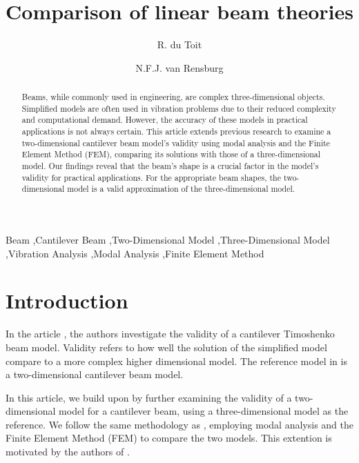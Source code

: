 
\usepackage{geometry}
\geometry{
  left=1.3in,
  right=1.4in,
  top=1.4in,
  bottom=1.4in,
}



\begin{frontmatter}

\title{Comparison of linear beam theories}

\author{R. du Toit}
\author{N.F.J. van Rensburg}
\address{Department of Mathematics, University of Pretoria, Pretoria, South Africa}


\begin{abstract}
Beams, while commonly used in engineering, are complex three-dimensional objects. Simplified models are often used in vibration problems due to their reduced complexity and computational demand. However, the accuracy of these models in practical applications is not always certain. This article extends previous research to examine a two-dimensional cantilever beam model's validity using modal analysis and the Finite Element Method (FEM), comparing its solutions with those of a three-dimensional model. Our findings reveal that the beam's shape is a crucial factor in the model's validity for practical applications. For the appropriate beam shapes, the two-dimensional model is a valid approximation of the three-dimensional model. 
\end{abstract}

\begin{keyword}
	Beam \sep Cantilever Beam \sep Two-Dimensional Model \sep Three-Dimensional Model \sep Vibration Analysis \sep Modal Analysis \sep Finite Element Method
\end{keyword}

\end{frontmatter}

\section{Introduction}
In the article \cite{LVV09}, the authors investigate the validity of a cantilever Timoshenko beam model. Validity refers to how well the solution of the simplified model compare to a more complex higher dimensional model. The reference model in \cite{LVV09} is a two-dimensional cantilever beam model.

In this article, we build upon \cite{LVV09} by further examining the validity of a two-dimensional model for a cantilever beam, using a three-dimensional model as the reference. We follow the same methodology as \cite{LVV09}, employing modal analysis and the Finite Element Method (FEM) to compare the two models. This extention is motivated by the authors of \cite{LVV09}.


